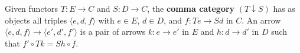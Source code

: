 Given functors $T: E \rightarrow C$ and $S: D \rightarrow C$, the \textbf{comma category} $(T \downarrow S)$ has as objects all triples $\langle e, d, f\rangle$ with $e \in E$, $d \in D$, and $f: Te \rightarrow Sd$ in $C$. An arrow $\langle e, d, f\rangle \rightarrow \langle e', d', f'\rangle$ is a pair of arrows $k: e \rightarrow e'$ in $E$ and $h: d \rightarrow d'$ in $D$ such that $f' \circ Tk = Sh \circ f$.